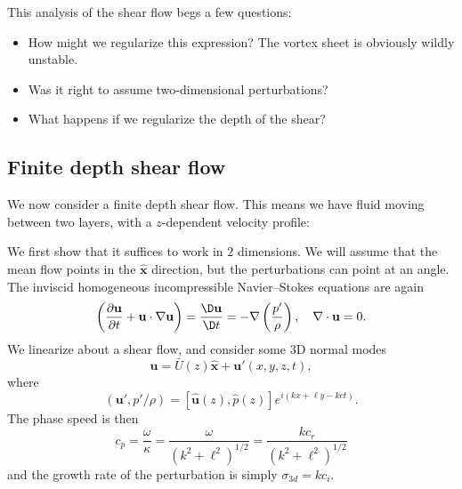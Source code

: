 \documentclass[a4paper]{article}
\begin{document}
This analysis of the shear flow begs a few questions:
\begin{itemize}
  \item How might we regularize this expression? The vortex sheet is obviously wildly unstable.
  \item Was it right to assume two-dimensional perturbations?
  \item What happens if we regularize the depth of the shear?
\end{itemize}

\subsection{Finite depth shear flow}
We now consider a finite depth shear flow. This means we have fluid moving between two layers, with a $z$-dependent velocity profile:
\begin{center}
\end{center}
We first show that it suffices to work in $2$ dimensions. We will assume that the mean flow points in the $\hat{\mathbf{x}}$ direction, but the perturbations can point at an angle. The inviscid homogeneous incompressible Navier--Stokes equations are again
\[
  \left(\frac{\partial \mathbf{u}}{\partial t} + \mathbf{u} \cdot \nabla \mathbf{u}\right) = \frac{\D \mathbf{u}}{\D t} = - \nabla \left(\frac{p'}{\rho}\right),\quad \nabla \cdot \mathbf{u} = 0.
\]
We linearize about a shear flow, and consider some 3D normal modes
\[
  \mathbf{u} = \bar{U}(z)\hat{\mathbf{x}} + \mathbf{u}'(x, y, z, t),
\]
where
\[
  (\mathbf{u}', p'/\rho) = [\hat{\mathbf{u}}(z), \hat{p}(z)]e^{i (kx + \ell y - kct)}.
\]
The phase speed is then
\[
  c_p = \frac{\omega}{\kappa} = \frac{\omega}{(k^2 + \ell^2)^{1/2}} = \frac{kc_r}{(k^2 + \ell^2)^{1/2}}
\]
and the growth rate of the perturbation is simply $\sigma_{3d} = k c_i$.
\end{document}
